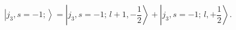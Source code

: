 \begin{equation}
\left| j_{3},s=-1;\right\rangle =\left| j_{3},s=-1;\,l+1,-\frac{1}{2}%
\right\rangle +\left| j_{3},s=-1;\,l,+\frac{1}{2}\right\rangle .
\label{eq41}
\end{equation}

